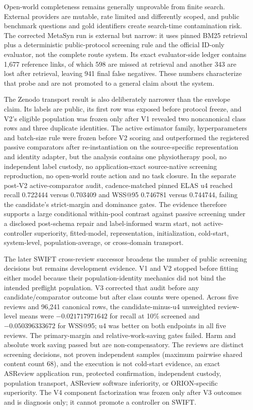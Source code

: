 \documentclass[11pt]{article}
\theoremstyle{definition}
\begin{document}
Open-world completeness remains generally unprovable from finite search. External providers are mutable, rate limited and differently scoped, and public benchmark questions and gold identifiers create search-time contamination risk. The corrected MetaSyn run is external but narrow: it uses pinned BM25 retrieval plus a deterministic public-protocol screening rule and the official ID-only evaluator, not the complete route system. Its exact evaluator-side ledger contains 1,677 reference links, of which 598 are missed at retrieval and another 343 are lost after retrieval, leaving 941 final false negatives. These numbers characterize that probe and are not promoted to a general claim about the system.

The Zenodo transport result is also deliberately narrower than the envelope
claim.  Its labels are public, its first row was exposed before protocol freeze,
and V2's eligible population was frozen only after V1 revealed two
noncanonical class rows and three duplicate identities. The active estimator
family, hyperparameters and batch-size rule were frozen before V2 scoring and
outperformed the registered passive
comparators after re-instantiation on the source-specific representation and
identity adapter, but the
analysis contains one physiotherapy pool, no independent label custody, no
application-exact source-native screening reproduction, no open-world route
action and no task closure. In the separate post-V2 active-comparator audit,
cadence-matched pinned ELAS u4 reached recall 0.722444 versus 0.703409 and
WSS@95 0.746781 versus 0.744744, failing the candidate's strict-margin and
dominance gates. The evidence therefore supports a large conditional
within-pool contrast against passive screening under a disclosed post-schema
repair and label-informed warm start, not active-controller superiority,
fitted-model, representation, initialization, cold-start, system-level,
population-average, or cross-domain transport.

The later SWIFT cross-review successor broadens the number of public screening
decisions but remains development evidence.  V1 and V2 stopped before fitting
either model because their population-identity mechanics did not bind the
intended preflight population.  V3 corrected that audit before any
candidate/comparator outcome but after class counts were opened.  Across five
reviews and 96,241 canonical rows, the candidate-minus-u4 unweighted
review-level means were $-0.021717971642$ for recall at 10\% screened and
$-0.050396333672$ for WSS@95; u4 was better on both endpoints in all five
reviews.  The primary-margin and relative-work-saving gates failed.  Harm and
absolute work saving passed but are non-compensatory.  The reviews are distinct
screening decisions, not proven independent samples (maximum pairwise shared
content count 68), and the execution is not cold-start evidence, an exact
ASReview application run, protected confirmation, independent custody,
population transport, ASReview software inferiority, or ORION-specific
superiority.  The V4 component factorization was frozen only after V3 outcomes
and is diagnosis only; it cannot promote a controller on SWIFT.
\end{document}
